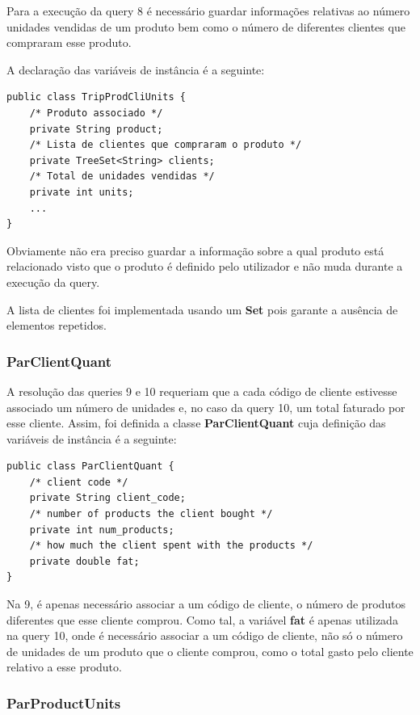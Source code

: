 \documentclass[10pt] {article}
\begin{document}
Para a execução da query 8 é necessário guardar informações relativas ao número unidades vendidas de um produto
bem como o número de diferentes clientes que compraram esse produto.

A declaração das variáveis de instância é a seguinte:

\begin{lstlisting}
public class TripProdCliUnits {
	/* Produto associado */
	private String product;
	/* Lista de clientes que compraram o produto */
	private TreeSet<String> clients;
	/* Total de unidades vendidas */
	private int units;
	...
}
\end{lstlisting}


Obviamente não era preciso guardar a informação sobre a qual produto está relacionado visto que o produto é definido pelo utilizador e não muda durante a execução da query.

A lista de clientes foi implementada usando um \color{blue} \textbf{Set} \color{black} pois garante a ausência de elementos 
repetidos.

\subsubsection{ParClientQuant}

A resolução das queries 9 e 10 requeriam que a cada código de cliente estivesse associado um número de unidades e, no caso da query 10, um total faturado por esse cliente. Assim, foi definida a classe \color{blue} \textbf{ParClientQuant} \color{black} cuja
definição das variáveis de instância é a seguinte:

\begin{lstlisting}
public class ParClientQuant {
    /* client code */
	private String client_code;
	/* number of products the client bought */
    private int num_products;
    /* how much the client spent with the products */
    private double fat;
}
\end{lstlisting}


Na  9, é apenas necessário associar a um código de cliente, o número de produtos diferentes que esse cliente comprou.
Como tal, a variável \textbf{fat} é apenas utilizada na query 10, onde é necessário associar a um código de cliente, não só o número de unidades de um produto que o cliente comprou, como o total gasto pelo cliente relativo a esse produto.

\subsubsection{ParProductUnits}
\end{document}
